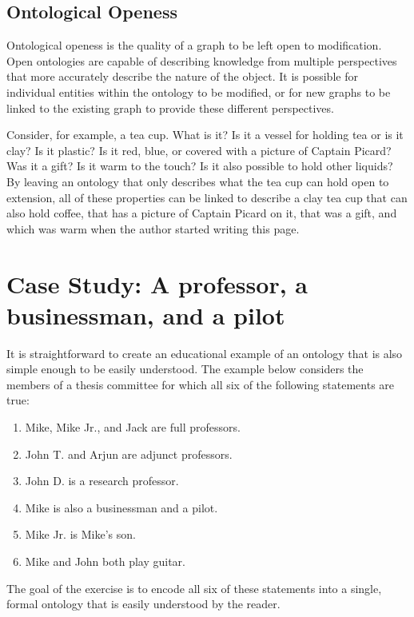 \subsection{Ontological Openess}

Ontological openess is the quality of a graph to be left open to modification.
Open ontologies are capable of describing knowledge from multiple perspectives
that more accurately describe the nature of the object. It is possible for
individual entities within the ontology to be modified, or for new graphs to be
linked to the existing graph to provide these different perspectives.

Consider, for example, a tea cup. What is it? Is it a vessel for holding tea or
is it clay? Is it plastic? Is it red, blue, or covered with a picture of
Captain Picard? Was it a gift? Is it warm to the touch? Is it also possible to
hold other liquids? By leaving an ontology that only describes what the tea cup
can hold open to extension, all of these properties can be linked to describe a
clay tea cup that can also hold coffee, that has a picture of Captain Picard on
it, that was a gift, and which was warm when the author started writing this
page.

\section{Case Study: A professor, a businessman, and a pilot}
\label{case-study}

It is straightforward to create an educational example of an ontology that is
also simple enough to be easily understood. The example below considers the
members of a thesis committee for which all six of the following statements are
true:

\begin{enumerate}
\item Mike, Mike Jr., and Jack are full professors. %
\item John T. and Arjun are adjunct professors.     %
\item John D. is a research professor.              %
\item Mike is also a businessman and a pilot.       %
\item Mike Jr. is Mike's son.                       %
\item Mike and John both play guitar.               %
\end{enumerate}

The goal of the exercise is to encode all six of these statements into a single,
formal ontology that is easily understood by the reader.

